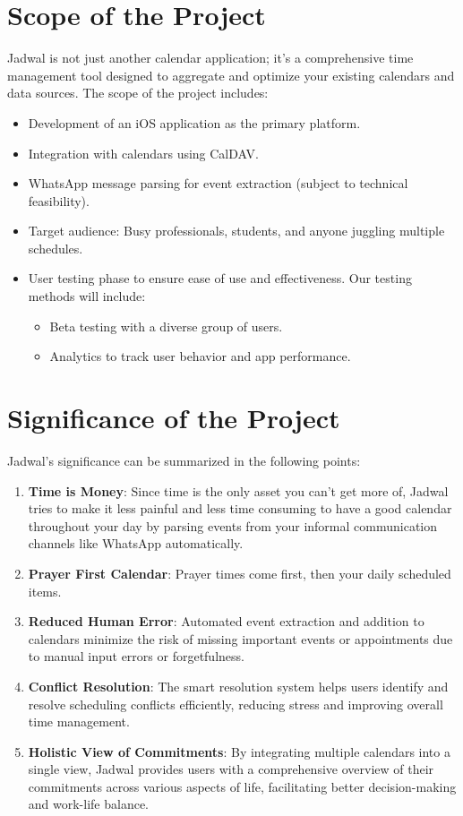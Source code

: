 \documentclass[12pt,a4paper]{report}
\begin{document}
\section{Scope of the Project}

Jadwal is not just another calendar application; it's a comprehensive time management tool designed to aggregate and optimize your existing calendars and data sources. The scope of the project includes:
\begin{itemize}
    \item Development of an iOS application as the primary platform.
    \item Integration with calendars using CalDAV.
    \item WhatsApp message parsing for event extraction (subject to technical feasibility).
    \item Target audience: Busy professionals, students, and anyone juggling multiple schedules.
    \item User testing phase to ensure ease of use and effectiveness. Our testing methods will include:
        \begin{itemize}
            \item Beta testing with a diverse group of users.
            \item Analytics to track user behavior and app performance.
        \end{itemize}
\end{itemize}



\section{Significance of the Project}

Jadwal's significance can be summarized in the following points:

\begin{enumerate}
    \item \textbf{Time is Money}: Since time is the only asset you can't get more of, Jadwal tries to make it less painful and less time consuming to have a good calendar throughout your day by parsing events from your informal communication channels like WhatsApp automatically.
    \item \textbf{Prayer First Calendar}: Prayer times come first, then your daily scheduled items.
    \item \textbf{Reduced Human Error}: Automated event extraction and addition to calendars minimize the risk of missing important events or appointments due to manual input errors or forgetfulness.
    \item \textbf{Conflict Resolution}: The smart resolution system helps users identify and resolve scheduling conflicts efficiently, reducing stress and improving overall time management.
    \item \textbf{Holistic View of Commitments}: By integrating multiple calendars into a single view, Jadwal provides users with a comprehensive overview of their commitments across various aspects of life, facilitating better decision-making and work-life balance.
\end{enumerate}
\end{document}
